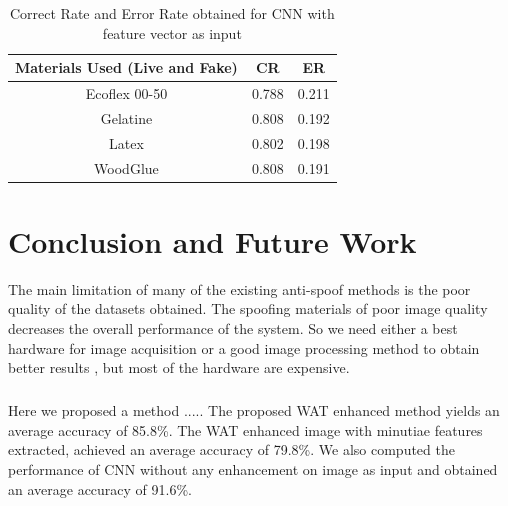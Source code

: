 \begin{table}[h] 
\caption {Correct Rate and Error Rate obtained for CNN with feature vector as input} 
\label{tab:22} 
\center
\begin{tabular}{|c|c|c|}
\hline 
Materials Used (Live and Fake) & CR & ER\\ 
\hline 
Ecoflex 00-50 & 0.788 & 0.211 \\ 
\hline 
Gelatine & 0.808 & 0.192 \\ 
\hline 
Latex & 0.802 & 0.198 \\ 
\hline 
WoodGlue & 0.808 & 0.191 \\ 
\hline 
\end{tabular}
\end{table}

\chapter{Conclusion and Future Work}
The main limitation of many of the existing anti-spoof methods is the poor quality of the datasets obtained. The spoofing materials of poor image quality decreases the overall performance of the system. So we need either a best hardware for image acquisition or a good image processing method to obtain better results , but most of the hardware are expensive. 
\paragraph{}Here we proposed a method .....
The proposed WAT enhanced method yields an average accuracy of 85.8\%. The WAT enhanced image with minutiae features extracted, achieved an average accuracy of 79.8\%. We also computed the performance of CNN without any enhancement on image as input and obtained an average accuracy of 91.6\%.


